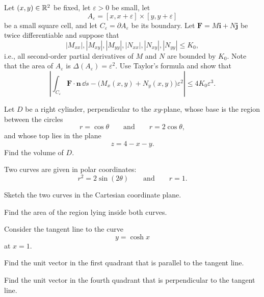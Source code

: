 \begin{problem}
Let $(x,y)\in\mathbb{R}^2$ be fixed, let $\varepsilon>0$ be small, let
\[
A_\varepsilon=[x,x+\varepsilon]\times[y,y+\varepsilon]
\]
be a small square cell, and let $C_\varepsilon=\partial A_\varepsilon$ be its boundary. Let $\mathbf F=M\mathbf i+N\mathbf j$ be twice differentiable and suppose that
\[
|M_{xx}|,|M_{xy}|,|M_{yy}|,|N_{xx}|,|N_{xy}|,|N_{yy}|\le K_0,
\]
i.e., all second-order partial derivatives of $M$ and $N$ are bounded by $K_0$. Note that the area of $A_\varepsilon$ is $\Delta(A_\varepsilon)=\varepsilon^2$. Use Taylor's formula and show that
\[
\left|
\int_{C_\varepsilon}\mathbf F\cdot\mathbf n\,\dd s
-
\bigl(M_x(x,y)+N_y(x,y)\bigr)\varepsilon^2
\right|
\le4K_0\varepsilon^3.
\]
\end{problem}

\begin{problem}
Let $D$ be a right cylinder, perpendicular to the $xy$-plane, whose base is the region between the circles
\[
r=\cos\theta
\qquad\text{and}\qquad
r=2\cos\theta,
\]
and whose top lies in the plane
\[
z=4-x-y.
\]
Find the volume of $D$.
\end{problem}


\begin{problem}
Two curves are given in polar coordinates:
\[
r^2=2\sin(2\theta)
\qquad\text{and}\qquad
r=1.
\]
\begin{problemsubparts}
\item Sketch the two curves in the Cartesian coordinate plane.
\item Find the area of the region lying inside both curves.
\end{problemsubparts}
\end{problem}

\begin{problem}
Consider the tangent line to the curve
\[
y=\cosh x
\]
at $x=1$.
\begin{problemsubparts}
\item Find the unit vector in the first quadrant that is parallel to the tangent line.
\item Find the unit vector in the fourth quadrant that is perpendicular to the tangent line.
\end{problemsubparts}
\end{problem}

